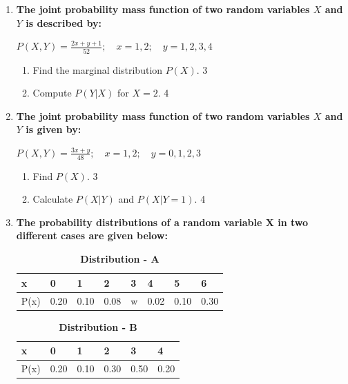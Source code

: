 \documentclass[a4paper,oneside]{book}
\begin{document}
\begin{enumerate}
  \item
  \textbf{The joint probability mass function of two random variables \( X \) and \( Y \) is described by:}
  
  \begin{center}
  \( \displaystyle P(X,Y) = \frac{2x + y + 1}{52}; \quad x = 1, 2; \quad y = 1, 2, 3, 4 \)
  \end{center}
 
  \begin{enumerate}
    \item
    	Find the marginal distribution \( P(X) \). \hfill 3
    \item
     	Compute \( P(Y \vert X) \) for \( X = 2 \). \hfill 4
  \end{enumerate}
  
  \item
  \textbf{The joint probability mass function of two random variables \( X \) and \( Y \) is given by:}
  
  \begin{center}
  \( \displaystyle P(X,Y) = \frac{3x + y}{48}; \quad x = 1, 2; \quad y = 0, 1, 2, 3 \)
  \end{center}
 
  \begin{enumerate}
    \item
    	Find \( P(X) \). \hfill 3
    \item
     	Calculate \( P(X \vert Y) \) and \( P(X \vert Y=1) \). \hfill 4
  \end{enumerate}



   \item
	  \textbf{The probability distributions of a random variable X in two different cases are given below:} 
	  
	  \begin{table}[!ht]
	  \caption {\textbf{Distribution - A}}
	   \begin{center}
\begin{tabular}{llllllll}
x    & 0    & 1    & 2    & 3 & 4    & 5    & 6    \\  \hline
P(x) & 0.20 & 0.10 & 0.08 & w & 0.02 & 0.10 & 0.30
\end{tabular}
 \end{center}
\end{table}

\begin{table}[h]
	  \caption {\textbf{Distribution - B}}
	   \begin{center}
\begin{tabular}{llllll}
x    & 0    & 1    & 2    & 3    & 4 \\ \hline
P(x) & 0.20 & 0.10 & 0.30 & 0.50 & 0.20   
\end{tabular}
\end{center}
\end{table}
  

\end{enumerate}
\end{document}
